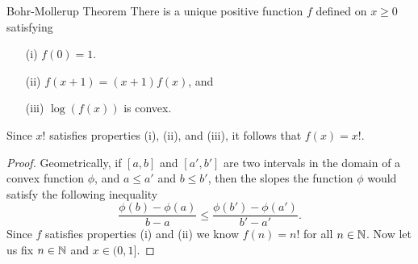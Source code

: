 \begin{theorem}{Bohr-Mollerup Theorem}{}
    There is a unique positive function \( f  \) defined on \( x \geq  0  \) satisfying 
    \begin{enumerate}
        \item[(i)] \( f(0) = 1  \).
        \item[(ii)] \( f(x+1) = (x+1) f(x)  \), and 
        \item[(iii)] \( \log(f(x))  \) is convex.
    \end{enumerate}
    Since \( x!  \) satisfies properties (i), (ii), and (iii), it follows that \( f(x) = x!  \).
\end{theorem}

\begin{proof}
    Geometrically, if \( [a,b]  \) and \( [a',b'] \) are two intervals in the domain of a convex function \( \phi \), and \( a \leq a' \) and \( b \leq b'\), then the slopes the function \( \phi  \) would satisfy the following inequality
    \[  \frac{ \phi(b) - \phi(a)  }{  b - a  } \leq \frac{ \phi(b') - \phi(a')  }{ b' - a' }.  \] Since \( f  \) satisfies properties (i) and (ii) we know \( f(n) = n!  \) for all \( n \in \mathbb{N}  \). Now let us fix \( n \in \mathbb{N}  \) and \( x \in (0,1] \).
\end{proof}

